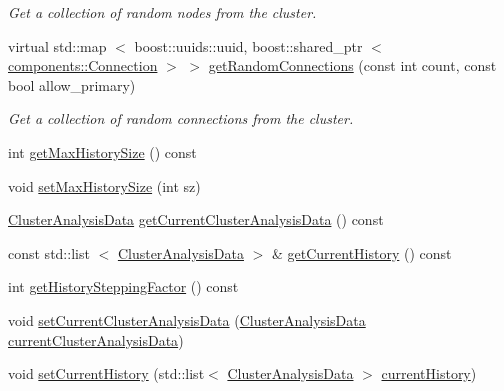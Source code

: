 \begin{DoxyCompactItemize}
\begin{DoxyCompactList}\small\item\em \-Get a collection of random nodes from the cluster. \end{DoxyCompactList}\item 
virtual std\-::map\*
$<$ boost\-::uuids\-::uuid, \*
boost\-::shared\-\_\-ptr\*
$<$ \hyperlink{classcryomesh_1_1components_1_1Connection}{components\-::\-Connection} $>$ $>$ \hyperlink{classcryomesh_1_1manipulators_1_1ClusterArchitect_a325de5c9d5a956af23b42da995b67c9a}{get\-Random\-Connections} (const int count, const bool allow\-\_\-primary)
\begin{DoxyCompactList}\small\item\em \-Get a collection of random connections from the cluster. \end{DoxyCompactList}\item 
int \hyperlink{classcryomesh_1_1manipulators_1_1ClusterArchitect_a35ef78740a40db97d54ca44ea660841b}{get\-Max\-History\-Size} () const 
\item 
void \hyperlink{classcryomesh_1_1manipulators_1_1ClusterArchitect_a4192c928465d82dbad196d3331052545}{set\-Max\-History\-Size} (int sz)
\item 
\hyperlink{classcryomesh_1_1manipulators_1_1ClusterAnalysisData}{\-Cluster\-Analysis\-Data} \hyperlink{classcryomesh_1_1manipulators_1_1ClusterArchitect_aa0a901c7d11f35cf8dbde4ecd7f2d467}{get\-Current\-Cluster\-Analysis\-Data} () const 
\item 
const std\-::list\*
$<$ \hyperlink{classcryomesh_1_1manipulators_1_1ClusterAnalysisData}{\-Cluster\-Analysis\-Data} $>$ \& \hyperlink{classcryomesh_1_1manipulators_1_1ClusterArchitect_aab7a3fce246914548d090315316d90a1}{get\-Current\-History} () const 
\item 
int \hyperlink{classcryomesh_1_1manipulators_1_1ClusterArchitect_af3bae257112679c24736b49c9fe8ccee}{get\-History\-Stepping\-Factor} () const 
\item 
void \hyperlink{classcryomesh_1_1manipulators_1_1ClusterArchitect_ab2bfac465a4ca8982ae17af0cf7cd19c}{set\-Current\-Cluster\-Analysis\-Data} (\hyperlink{classcryomesh_1_1manipulators_1_1ClusterAnalysisData}{\-Cluster\-Analysis\-Data} \hyperlink{classcryomesh_1_1manipulators_1_1ClusterArchitect_a90412a42b771826aa325163eb8dd35ea}{current\-Cluster\-Analysis\-Data})
\item 
void \hyperlink{classcryomesh_1_1manipulators_1_1ClusterArchitect_af901173faf53da06d91165779e31cae2}{set\-Current\-History} (std\-::list$<$ \hyperlink{classcryomesh_1_1manipulators_1_1ClusterAnalysisData}{\-Cluster\-Analysis\-Data} $>$ \hyperlink{classcryomesh_1_1manipulators_1_1ClusterArchitect_a5ab807b2682f56ffd1cfcf8b7b54b2a0}{current\-History})

\end{DoxyCompactItemize}
